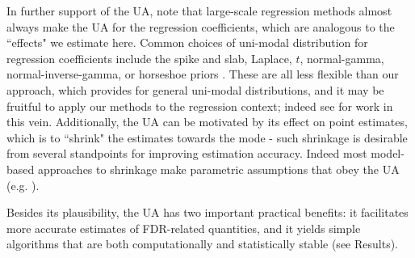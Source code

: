\documentclass[11pt]{article}
\def\qvalue{{\tt qvalue}\xspace}
\def\locfdr{{\tt locfdr}\xspace}
\def\mixfdr{{\tt mixfdr}\xspace}
\begin{document}


In further support of the UA, note that large-scale regression methods almost always make the UA for the regression coefficients,
which are analogous to the ``effects" we estimate here. 
Common choices of uni-modal distribution for regression coefficients 
include the spike and slab, Laplace, $t$, normal-gamma, normal-inverse-gamma, or horseshoe priors \cite{carvalho2010horseshoe}.
These are all less flexible than our approach, which provides for general uni-modal distributions, and 
it may be fruitful to apply our methods to the regression context; indeed see \cite{moser:2015} for work in this vein. 
Additionally, the UA can be motivated by its effect on point estimates, which is to ``shrink" the estimates towards the mode - 
such shrinkage is desirable from several standpoints for improving estimation accuracy. Indeed most model-based approaches to shrinkage
make parametric assumptions that obey the UA (e.g. \cite{johnstone2004needles}).

Besides its plausibility, the UA has two important practical benefits: it facilitates more accurate estimates
of FDR-related quantities, and it yields simple algorithms that are both computationally
and statistically stable (see Results).
\end{document}
